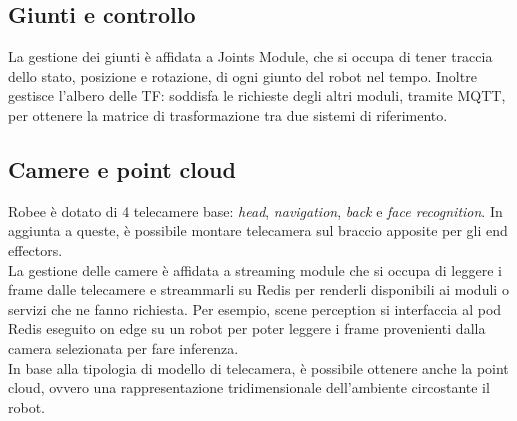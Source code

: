 \subsection{Giunti e controllo}
La gestione dei giunti è affidata a Joints Module, che si occupa di tener traccia dello stato, posizione e rotazione, di ogni giunto del robot nel tempo. Inoltre
gestisce l'albero delle TF: soddisfa le richieste degli altri moduli, tramite MQTT, per ottenere la matrice di trasformazione tra due sistemi di riferimento.

\subsection{Camere e point cloud}
Robee è dotato di 4 telecamere base: \textit{head}, \textit{navigation}, \textit{back} e \textit{face recognition}. In aggiunta a queste, è possibile montare telecamera sul braccio apposite per gli end effectors.\\
La gestione delle camere è affidata a streaming module che si occupa di leggere i frame dalle telecamere e streammarli su Redis per renderli disponibili ai moduli o servizi che ne fanno richiesta. Per esempio, scene perception si interfaccia al pod Redis eseguito on edge su un robot per poter leggere i frame provenienti dalla camera selezionata per fare inferenza. \\
In base alla tipologia di modello di telecamera, è possibile ottenere anche la point cloud, ovvero una rappresentazione tridimensionale dell'ambiente circostante il robot.

